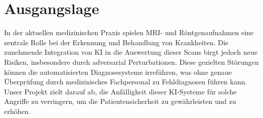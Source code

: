 \section{Ausgangslage}
In der aktuellen medizinischen Praxis spielen MRI- und Röntgenaufnahmen eine zentrale Rolle bei der Erkennung und Behandlung von Krankheiten. Die zunehmende Integration von KI in die Auswertung dieser Scans birgt jedoch neue Risiken, insbesondere durch adversarial Perturbationen. Diese gezielten Störungen können die automatisierten Diagnosesysteme irreführen, was ohne genaue Überprüfung durch medizinisches Fachpersonal zu Fehldiagnosen führen kann. Unser Projekt zielt darauf ab, die Anfälligkeit dieser KI-Systeme für solche Angriffe zu verringern, um die Patientensicherheit zu gewährleisten und zu erhöhen.